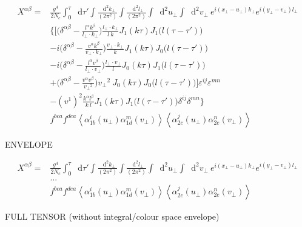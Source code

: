 \documentclass[12pt]{article}
\newcommand*\diff{\mathop{}\!\mathrm{d}}
\begin{document}
\begin{equation*}
\begin{split}
 X^{\alpha \beta} = &
\frac{g^4}{2 N_c}
\int_0^\tau \diff \tau'
\int \frac{\diff^2 k_\perp}{(2\pi^2)}
\int \frac{\diff^2 l_\perp}{(2\pi^2)}
\int \diff^2 u_\perp
\int \diff^2 v_\perp ~
e^{i (x_\perp - u_\perp) k_\perp}
e^{i (y_\perp - v_\perp) l_\perp} \\
& \bigg\{ \bigg[ \Big(\delta^{\alpha \beta}  - \frac{l^\alpha k^\beta}{l_\perp \cdot k_\perp}\Big) \frac{l_\perp \cdot k_\perp}{l ~k} J_1 (k \tau) J_1\big(l(\tau-\tau')\big) \\
& -i \Big(\delta^{\alpha \beta}  - \frac{v^\alpha k^\beta}{v_\perp \cdot k_\perp}\Big) \frac{v_\perp \cdot k_\perp}{k} J_1 (k \tau) J_0\big(l(\tau-\tau')\big) \\
& -i \Big(\delta^{\alpha \beta}  - \frac{l^\alpha v^\beta}{l_\perp \cdot v_\perp}\Big) \frac{l_\perp \cdot v_\perp}{l} J_0 (k \tau) J_1\big(l(\tau-\tau')\big) \\
& + \Big(\delta^{\alpha \beta}  - \frac{v^\alpha v^\beta}{{v_\perp}^2}\Big) {v_\perp}^2 ~ J_0 (k \tau) J_0\big(l(\tau-\tau')\big) \bigg] \varepsilon^{ij} \varepsilon^{mn} \\ 
& -(v^1)^2 \frac{k^\alpha l^\beta}{k ~l} J_1 (k \tau) J_1\big(l(\tau-\tau')\big) \delta^{ij} \delta^{mn} \bigg\} \\
&  f^{bca} f^{dea}
\left< \alpha^i_{1b} (u_\perp) \alpha^m_{1d} (v_\perp) \right>  \left< \alpha^j_{2c} (u_\perp) \alpha^n_{2e} (v_\perp) \right>
\end{split}
\end{equation*}

\newpage
ENVELOPE

\begin{equation*}
\begin{split}
 X^{\alpha \beta} = &
\frac{g^4}{2 N_c}
\int_0^\tau \diff \tau'
\int \frac{\diff^2 k_\perp}{(2\pi^2)}
\int \frac{\diff^2 l_\perp}{(2\pi^2)}
\int \diff^2 u_\perp
\int \diff^2 v_\perp ~
e^{i (x_\perp - u_\perp) k_\perp}
e^{i (y_\perp - v_\perp) l_\perp} \\
& ... \\
&  f^{bca} f^{dea}
\left< \alpha^i_{1b} (u_\perp) \alpha^m_{1d} (v_\perp) \right>  \left< \alpha^j_{2c} (u_\perp) \alpha^n_{2e} (v_\perp) \right>
\end{split}
\end{equation*}


\newpage 

FULL TENSOR (without integral/colour space envelope)
\end{document}
